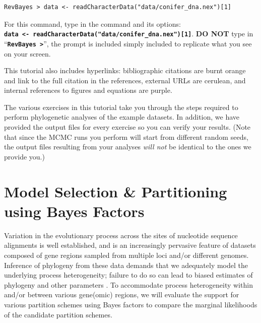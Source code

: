 \documentclass[11pt]{article}
\newcommand{\taha}[1]{{\textcolor{red}{[TAH comment: #1]}}} %
\newcommand{\cl}[1]{{\texttt{\textbf{#1}}}}
\begin{document}
{\tt \begin{snugshade*}
\begin{lstlisting}
RevBayes > data <- readCharacterData("data/conifer_dna.nex")[1]
\end{lstlisting}
\end{snugshade*}}

For this command, type in the command and its options:\\ \cl{data <- readCharacterData("data/conifer\_dna.nex")[1]}. \textbf{DO NOT} type in ``\cl{RevBayes >}'', the prompt is included simply included to replicate what you see on your screen. 

%


This tutorial also includes hyperlinks: bibliographic citations are {\textcolor{citescol}{burnt orange}} and link to the full citation in the references, external URLs are {\textcolor{urlscol}{cerulean}}, and internal references to figures and equations are {\textcolor{linkscol}{purple}}.

The various exercises in this tutorial take you through the steps required to perform phylogenetic analyses of the example datasets. 
In addition, we have provided the output files for every exercise so you can verify your results. (Note that since the MCMC runs you perform will start from different random seeds, the output files resulting from your analyses \textit{will not} be identical to the ones we provide you.)

\exs{Download data and output files from: \taha{add link to data files}
}

\bigskip
\section{Model Selection \& Partitioning using Bayes Factors}

Variation in the evolutionary process across the sites of nucleotide 
sequence alignments is well established, and is an increasingly pervasive feature of datasets 
composed of gene regions sampled from multiple loci and/or different genomes.
Inference of phylogeny from these data demands that we adequately model the underlying process heterogeneity; 
failure to do so can lead to biased estimates of phylogeny and other parameters \citep{brown07}.
To accommodate process heterogeneity within and/or between various gene(omic)
regions, we will evaluate the support for various partition schemes 
using Bayes factors to compare the marginal likelihoods of the candidate partition schemes.
\end{document}
